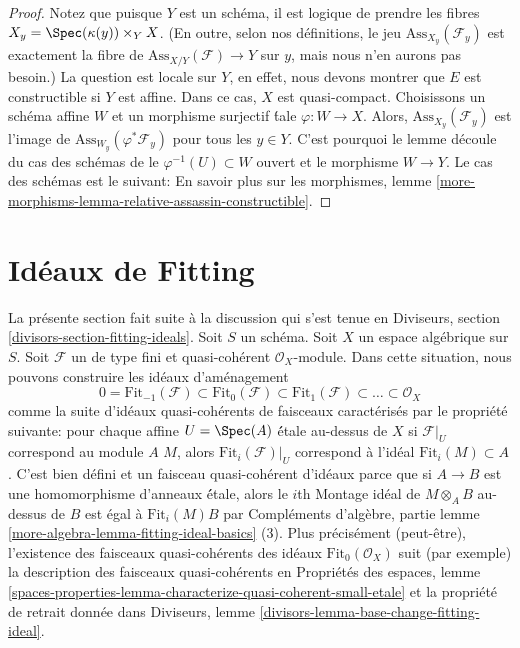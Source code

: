\begin{proof}
Notez que puisque $Y$ est un schéma, il est logique de prendre les fibres
$X_y = \Spec(\kappa(y)) \times_Y X$. (En outre, selon nos définitions,
le jeu $\text{Ass}_{X_y}(\mathcal{F}_y)$ est exactement la fibre de
$\text{Ass}_{X/Y}(\mathcal{F}) \to Y$ sur $y$, mais nous n'en aurons pas besoin.)
La question est locale sur $Y$, en effet, nous devons montrer que
$E$ est constructible si $Y$ est affine.
Dans ce cas, $X$ est quasi-compact. Choisissons un schéma affine $W$
et un morphisme surjectif \'tale $\varphi : W \to X$.
Alors, $\text{Ass}_{X_y}(\mathcal{F}_y)$ est l'image de
$\text{Ass}_{W_y}(\varphi^*\mathcal{F}_y)$ pour tous les $y \in Y$.
C'est pourquoi le lemme découle du cas des schémas de
le $\varphi^{-1}(U) \subset W$ ouvert et le morphisme $W \to Y$.
Le cas des schémas est le suivant:
En savoir plus sur les morphismes, lemme
\ref{more-morphisms-lemma-relative-assassin-constructible}.
\end{proof}









\section{Idéaux de Fitting}
\label{section-fitting-ideals}

\noindent
La présente section fait suite à la discussion qui s'est tenue en
Diviseurs, section \ref{divisors-section-fitting-ideals}.
Soit $S$ un schéma. Soit $X$ un espace algébrique sur $S$.
Soit $\mathcal{F}$ un de type fini et quasi-cohérent $\mathcal{O}_X$-module.
Dans cette situation, nous pouvons construire les idéaux d'aménagement
$$
0 = \text{Fit}_{-1}(\mathcal{F}) \subset \text{Fit}_0(\mathcal{F}) \subset
\text{Fit}_1(\mathcal{F}) \subset \ldots \subset \mathcal{O}_X
$$
comme la suite d'idéaux quasi-cohérents de faisceaux caractérisés par le
propriété suivante: pour chaque affine $U = \Spec(A)$ \'étale au-dessus de $X$
si $\mathcal{F}|_U$ correspond au module $A$ $M$, alors
$\text{Fit}_i(\mathcal{F})|_U$
correspond à l'idéal $\text{Fit}_i(M) \subset A$.
C'est bien défini et un faisceau quasi-cohérent d'idéaux parce que
si $A \to B$ est une homomorphisme d'anneaux \'étale, alors le $i$th Montage idéal
de $M \otimes_A B$ au-dessus de $B$ est égal à $\text{Fit}_i(M) B$ par
Compléments d'algèbre, partie lemme \ref{more-algebra-lemma-fitting-ideal-basics} (3).
Plus précisément (peut-être), l'existence des faisceaux quasi-cohérents des idéaux
$\text{Fit}_0(\mathcal{O}_X)$ suit (par exemple)
la description des faisceaux quasi-cohérents en
Propriétés des espaces, lemme
\ref{spaces-properties-lemma-characterize-quasi-coherent-small-etale}
et la propriété de retrait donnée dans
Diviseurs, lemme \ref{divisors-lemma-base-change-fitting-ideal}.

